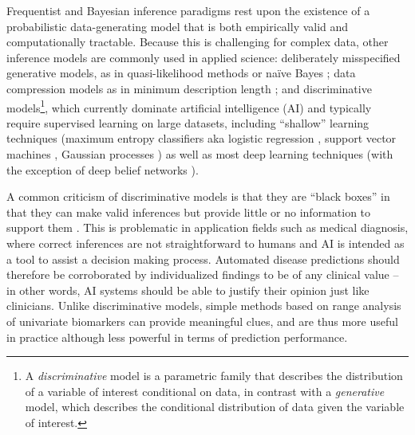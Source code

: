 \documentclass[english]{scrartcl}
\begin{document}
Frequentist and Bayesian inference paradigms rest upon the existence of a probabilistic data-generating model that is both empirically valid and computationally tractable. Because this is challenging for complex data, other inference models are commonly used in applied science: deliberately misspecified generative models, as in quasi-likelihood methods \cite{White-82,Walker-13} or na\"ive Bayes \cite{Ng-01}; data compression models as in minimum description length \cite{Grunwald-07}; and discriminative models\footnote{A {\em discriminative} model is a parametric family that describes the distribution of a variable of interest conditional on data, in contrast with a {\em generative} model, which describes the conditional distribution of data given the variable of interest.}, which currently dominate artificial intelligence (AI) and typically require supervised learning on large datasets, including ``shallow'' learning techniques (maximum entropy classifiers aka logistic regression \cite{BergerA-96}, support vector machines \cite{Vapnik-00}, Gaussian processes \cite{Rasmussen-06}) as well as most deep learning techniques \cite{Lecun-15,Goodfellow-16} (with the exception of deep belief networks \cite{Hinton-06,Fischer-14}). 

A common criticism of discriminative models is that they are ``black boxes'' in that they can make valid inferences but provide little or no information to support them \cite{Molnar-18}. This is problematic in application fields such as medical diagnosis, where correct inferences are not straightforward to humans and AI is intended as a tool to assist a decision making process. Automated disease predictions should therefore be corroborated by individualized findings to be of any clinical value -- in other words, AI systems should be able to justify their opinion just like clinicians. Unlike discriminative models, simple methods based on range analysis of univariate biomarkers can provide meaningful clues, and are thus more useful in practice although less powerful in terms of prediction performance.


\end{document}
